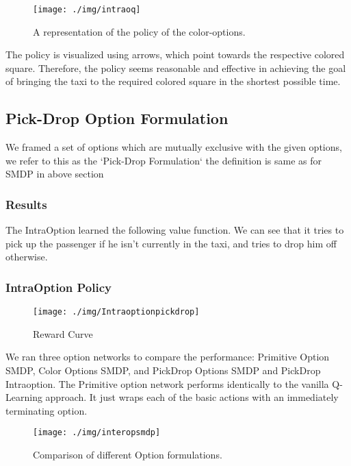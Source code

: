 \documentclass[A4]{article}
\begin{document}
    \begin{figure}[H]
        \centering
        \texttt{[image: ./img/intraoq]}
        \caption{A representation of the policy of the color-options.}\label{fig:intraoq}
    \end{figure}

    The policy is visualized using arrows, which point towards the respective colored square. Therefore, the policy seems reasonable and effective in achieving the goal of bringing the taxi to the required colored square in the shortest possible time.

    \subsection{Pick-Drop Option Formulation}
    We framed a set of options which are mutually exclusive with the given options, we refer to this as the `Pick-Drop Formulation` the definition is same as for SMDP in above section

    \subsubsection{Results}
    The IntraOption learned the following value function.
    We can see that it tries to pick up the passenger if he isn't currently in the taxi, and tries to drop him off otherwise.

    \subsubsection{IntraOption Policy}
    \begin{figure}[H]
        \centering
        \centering
        \texttt{[image: ./img/Intraoptionpickdrop]}
        \caption{Reward Curve}
    \end{figure}

    \noindent We ran three option networks to compare the performance: Primitive Option SMDP, Color Options SMDP, and PickDrop Options SMDP and PickDrop Intraoption.
    The Primitive option network performs identically to the vanilla Q-Learning approach.
    It just wraps each of the basic actions with an immediately terminating option.
    \begin{figure}[H]
        \centering
        \texttt{[image: ./img/interopsmdp]}
        \caption{Comparison of different Option formulations.}
    \end{figure}
\end{document}
